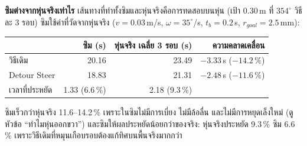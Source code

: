 \documentclass[11pt,a4paper]{article}
\begin{document}
{\medskip
\noindent\textbf{ซิมต่างจากหุ่นจริงเท่าไร} เส้นทางที่ทำทั้งซิมและหุ่นจริงคือการทดสอบบนหุ่น
(เป้า 0.30\,m ที่ $354^\circ$ วิธีละ 3 รอบ) ซิมใช้ค่าที่วัดจากหุ่นจริง
($v = 0.03$\,m/s, $\omega = 35^\circ$/s, $t_b = 0.2$\,s, $r_{goal} = 2.5$\,mm):
\begin{center}
\begin{tabular}{lrrr}
\toprule
 & ซิม (s) & หุ่นจริง เฉลี่ย 3 รอบ (s) & ความคลาดเคลื่อน \\
\midrule
วิธีเดิม       & 20.16 & 23.49 & $-3.33$\,s ($-14.2\,\%$) \\
Detour Steer & 18.83 & 21.31 & $-2.48$\,s ($-11.6\,\%$) \\
เวลาที่ประหยัด & 1.33 (6.6\,\%) & 2.18 (9.3\,\%) & \\
\bottomrule
\end{tabular}
\end{center}
ซิมเร็วกว่าหุ่นจริง 11.6--14.2\,\% เพราะในซิมไม่มีการเบี่ยง ไม่มีล้อลื่น และไม่มีการหยุดเล็งใหม่
(ดูหัวข้อ ``ทำไมหุ่นออกขวา'') และซิมให้ผลประหยัดน้อยกว่าของจริง: หุ่นจริงประหยัด 9.3\,\% ซิม 6.6\,\%
เพราะวิธีเดิมที่หมุนเกือบรอบต้องแก้ทิศบนพื้นจริงมากกว่า

}
\end{document}
